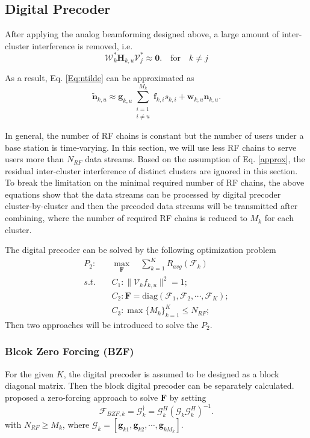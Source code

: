 \documentclass[conference]{IEEEtran}
\begin{document}
{\subsection{Digital Precoder}\label{digital}

After applying the analog beamforming designed above, a large amount of inter-cluster interference is removed, i.e.
\begin{equation}\label{approx}
\bm{\mathcal{W}}^*_{k}\bm{H}_{k,u}\bm{\mathcal{V}}^*_{j} \approx \bm{0}. \quad \text{for} \quad k \neq j
\end{equation}

As a result, Eq. \eqref{Eq:ntilde} can be approximated as
\begin{equation}\label{noiseapprox}
\tilde{\bm{n}}_{k,u} \approx \bm{g}_{k,u}\sum_{\substack{i=1\\i\neq u}}^{M_k}\bm{f}_{k,i}s_{k,i}+\bm{w}_{k,u}\bm{n}_{k,u}.
\end{equation}

In general, the number of RF chains is constant but the number of users under a base station is time-varying.  In this section, we will use less RF chains to serve users more than $N_{RF}$ data streams. Based on the assumption of Eq. \eqref{approx}, the residual inter-cluster interference of distinct clusters are ignored in this section. To break the limitation on the minimal required number of RF chains, the above equations show that the data streams can be processed by digital precoder cluster-by-cluster and then the precoded data streams will be transmitted after combining, where the number of required RF chains is reduced to $M_k$ for each cluster.


The digital precoder can be solved by the following optimization problem
\begin{align}\label{eq:digital}
P_2: \quad&\max_{\bm F}\quad \sum_{k=1}^{K} R_{avg}(\bm{\mathcal{F}}_k)\\ \nonumber
s.t. \quad &C_1: \|\bm{\mathcal{V}}_k{f}_{k,u}\|^2=1;\nonumber\\
&C_2: \bm{F} = \text{diag}(\bm{\mathcal{F}}_1, \bm{\mathcal{F}}_2, \cdots, \bm{\mathcal{F}}_{K});\nonumber\\
&C_3: \max \{M_k\}_{k=1}^K \leq N_{RF};\nonumber
\end{align}
Then two approaches will be introduced to solve the $P_2$.

\subsubsection{Blcok Zero Forcing (BZF)}
For the given $K$, the digital precoder is assumed to be designed as a block diagonal matrix. Then the block digital precoder can be separately calculated. \cite{alkhateeb2014channel} proposed a zero-forcing approach to solve $\bm{F}$ by setting
\begin{equation}
\bm{\mathcal{F}}_{BZF,k} = \bm{\mathcal{G}}_k^\dagger = \bm{\mathcal{G}}_k^H (\bm{\mathcal{G}}_k \bm{\mathcal{G}}_k^H)^{-1}.
\end{equation}
with $N_{RF}\geq M_k$, where $\bm{\mathcal{G}}_k = [\bm{g}_{k1}, \bm{g}_{k2},\cdots,\bm{g}_{kM_k}]$.

}
\end{document}
